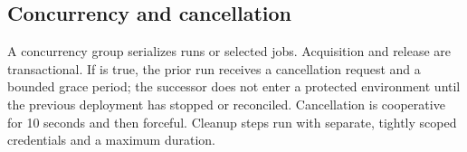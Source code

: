 \subsection{Concurrency and cancellation}

A concurrency group serializes runs or selected jobs. Acquisition and release are
transactional. If  is true, the prior run receives a
cancellation request and a bounded grace period; the successor does not enter a
protected environment until the previous deployment has stopped or reconciled.
Cancellation is cooperative for 10 seconds and then forceful. Cleanup steps run with
separate, tightly scoped credentials and a maximum duration.

